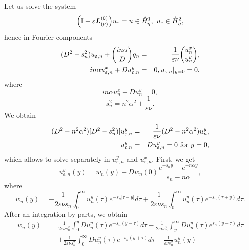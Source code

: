 \documentclass[11pt]{article}
\begin{document}
\label{proof6} 
Let us solve the system%
\begin{equation}
\Bigl( \mathbb{I}-\varepsilon \boldsymbol{L}_{(\nu )}^{(0)} \Bigr)u_{\varepsilon }=u\in 
\mathring{H}_{\eta}^{1},\text{ }u_{\varepsilon }\in \mathring{H}_{\eta}^{2},
\label{basic syst}
\end{equation}%
hence in Fourier components%
\begin{eqnarray*}
(D^{2}-s_{n}^{2})u_{\varepsilon ,n}+\binom{in\alpha }{D}q_{n} &=&\frac{1}{%
\varepsilon \nu }\binom{u_{n}^{x}}{u_{n}^{y}}, \\
in\alpha u_{\varepsilon ,n}^{x}+Du_{\varepsilon ,n}^{y} &=&0,u_{\varepsilon
,n}|_{y=0}=0,
\end{eqnarray*}%
where 
\begin{equation*}
in\alpha u_{n}^{x}+Du_{n}^{y}=0,
\end{equation*}%
\begin{equation*}
s_{n}^{2}=n^{2}\alpha ^{2}+\frac{1}{\varepsilon \nu }.
\end{equation*}%
We obtain%
\begin{eqnarray*}
(D^{2}-n^{2}\alpha ^{2})[D^{2}-s_{n}^{2})]u_{\varepsilon ,n}^{y} &=&\frac{1}{%
\varepsilon \nu }(D^{2}-n^{2}\alpha ^{2})u_{n}^{y}, \\
u_{\varepsilon ,n}^{y} &=&Du_{\varepsilon ,n}^{y}=0\text{ for }y=0,
\end{eqnarray*}%
which allows to solve separately in $u_{\varepsilon ,n}^{y}$ and $%
u_{\varepsilon ,n}^{x}.$ First, we get%
\begin{equation}
u_{\varepsilon ,n}^{y}(y)=w_{n}(y)-Dw_{n}(0)\frac{e^{-s_{n}y}-e^{-n\alpha y}}{s_{n}-n\alpha },  \label{u eps n}
\end{equation}%
where%
\begin{equation*}
w_{n}(y)=-\frac{1}{2\varepsilon \nu s_{n}}\int_{0}^{\infty }u_{n}^{y}(\tau
)e^{-s_{n}|\tau -y|}d\tau +\frac{1}{2\varepsilon \nu s_{n}}\int_{0}^{\infty
}u_{n}^{y}(\tau )e^{-s_{n}(\tau +y)}d\tau .
\end{equation*}%
After an integration by parts, we obtain 
\begin{eqnarray*}
w_{n}(y) &=&\frac{1}{2\varepsilon \nu s_{n}^{2}}\int_{0}^{y}Du_{n}^{y}(\tau
)e^{-s_{n}(y-\tau )}d\tau -\frac{1}{2\varepsilon \nu s_{n}^{2}}%
\int_{y}^{\infty }Du_{n}^{y}(\tau )e^{s_{n}(y-\tau )}d\tau  \\
&&+\frac{1}{2\varepsilon \nu s_{n}^{2}}\int_{0}^{\infty }Du_{n}^{y}(\tau
)e^{-s_{n}(y+\tau )}d\tau -\frac{1}{\varepsilon \nu s_{n}^{2}}u_{n}^{y}(y)
\end{eqnarray*}%
\end{document}
